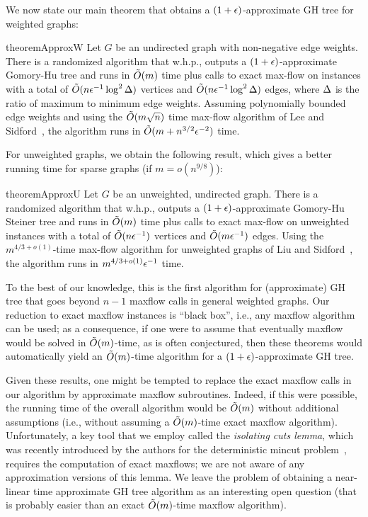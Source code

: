 We now state our main theorem that obtains a $(1+\epsilon)$-approximate GH tree for weighted graphs:
\begin{restatable}{theorem}{ApproxW}
    Let $G$ be an undirected graph with non-negative edge weights. There is a randomized algorithm that w.h.p., outputs a $(1+\epsilon)$-approximate Gomory-Hu tree and runs in $\tilde{O}(m)$ time plus calls to exact max-flow on instances with a total of $\tilde{O}(n\epsilon^{-1}\log^2\Delta)$ vertices and $\tilde{O}(n\epsilon^{-1}\log^2\Delta)$ edges, where $\Delta$ is the ratio of maximum to minimum edge weights. Assuming polynomially bounded edge weights and using the $\tilde{O}(m\sqrt{n})$ time max-flow algorithm of Lee and Sidford~\cite{LeeSflow}, the algorithm runs in $\tilde{O}(m + n^{3/2}\epsilon^{-2})$ time.
\end{restatable}
For unweighted graphs, we obtain the following result, which gives a better running time for sparse graphs (if $m = o(n^{9/8})$):
\begin{restatable}{theorem}{ApproxU}
Let $G$ be an unweighted, undirected graph. There is a randomized algorithm that w.h.p., outputs a $(1+\epsilon)$-approximate Gomory-Hu Steiner tree and runs in $\tilde{O}(m)$ time plus calls to exact max-flow on unweighted instances with a total of $\tilde{O}(n\epsilon^{-1})$ vertices and $\tilde{O}(m\epsilon^{-1})$ edges. Using the $m^{4/3+o(1)}$-time max-flow algorithm for unweighted graphs of Liu and Sidford~\cite{liu2020faster}, the algorithm runs in $m^{4/3+o(1)}\epsilon^{-1}$ time.
\end{restatable}

To the best of our knowledge, this is the first algorithm for (approximate) GH tree that goes beyond $n-1$ maxflow calls in general weighted graphs. Our reduction to exact maxflow instances is ``black box'', i.e., any maxflow algorithm can be used; as a consequence, if one were to assume that eventually maxflow would be solved in $\tilde{O}(m)$-time, as is often conjectured, then these theorems would automatically yield an $\tilde{O}(m)$-time algorithm for a $(1+\epsilon)$-approximate GH tree.

Given these results, one might be tempted to replace the exact maxflow calls in our algorithm by approximate maxflow subroutines. Indeed, if this were possible, the running time of the overall algorithm would be $\tilde{O}(m)$ without additional assumptions (i.e., without assuming a $\tilde{O}(m)$-time exact maxflow algorithm). Unfortunately, a key tool that we employ called the {\em isolating cuts lemma}, which was recently introduced by the authors for the deterministic mincut problem~\cite{LiP20}, requires the computation of exact maxflows; we are not aware of any approximation versions of this lemma. We leave the problem of obtaining a near-linear time approximate GH tree algorithm as an interesting open question (that is probably easier than an exact $\tilde{O}(m)$-time maxflow algorithm).


